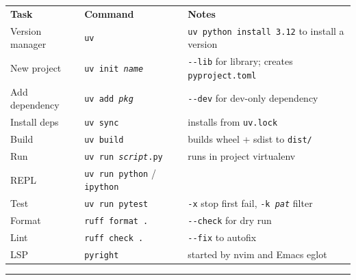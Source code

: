 \documentclass[10pt]{extarticle}
\begin{document}
\small


\begin{tabularx}{\linewidth}{@{}l@{\quad}l@{\quad}Y@{}}
\textbf{Task}        & \textbf{Command}                                  & \textbf{Notes} \\[2pt]
Version manager      & \texttt{uv}                                        & \texttt{uv python install 3.12} to install a version \\
New project          & \texttt{uv init \textit{name}}                     & \texttt{-{}-lib} for library; creates \texttt{pyproject.toml} \\
Add dependency       & \texttt{uv add \textit{pkg}}                       & \texttt{-{}-dev} for dev-only dependency \\
Install deps         & \texttt{uv sync}                                   & installs from \texttt{uv.lock} \\
Build                & \texttt{uv build}                                  & builds wheel + sdist to \texttt{dist/} \\
Run                  & \texttt{uv run \textit{script}.py}                 & runs in project virtualenv \\
REPL                 & \texttt{uv run python} / \texttt{ipython}          & \\
Test                 & \texttt{uv run pytest}                             & \texttt{-x} stop first fail, \texttt{-k \textit{pat}} filter \\
Format               & \texttt{ruff format .}                             & \texttt{-{}-check} for dry run \\
Lint                 & \texttt{ruff check .}                              & \texttt{-{}-fix} to autofix \\
LSP                  & \texttt{pyright}                                   & started by nvim and Emacs eglot \\
\end{tabularx}

\vspace{6pt}
\rule{\linewidth}{0.2pt}
\end{document}
